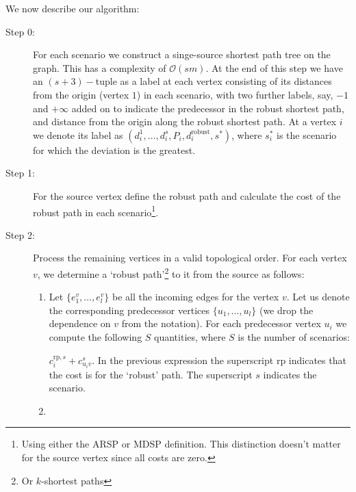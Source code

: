 \documentclass{article}
\begin{document}
We now describe our algorithm:
\begin{description}
\item[Step 0:] For each scenario we construct a singe-source shortest path tree on the graph. This has a complexity of $\mathcal{O}(s m)$. At the end of this step we have an $(s+3)-$tuple as a label at each vertex consisting of its distances from the origin (vertex $1$) in each scenario, with two further labels, say, $-1$ and $+\infty$ added on to indicate the predecessor in the robust shortest path, and distance from the origin along the robust shortest path. At a vertex $i$ we denote its label as $(d_i^1,\dots,d_i^s,P_i,d_i^{\textrm{robust}},s^{*})$, where $s_i^{*}$ is the scenario for which the deviation is the greatest.

\item[Step 1:] For the source vertex define the robust path and calculate the cost of the robust path in each scenario\footnote{Using either the ARSP or MDSP definition. This distinction doesn't matter for the source vertex since all costs are zero.}.

\item[Step 2:] Process the remaining vertices in a valid topological order. For each vertex $v$, we determine a `robust path'\footnote{Or $k$-shortest paths} to it from the source as follows:
\begin{enumerate}
\item Let $\{e^v_1,\dots,e^v_l\}$ be all the incoming edges for the vertex $v$. Let us denote the corresponding predecessor vertices $\{u_1,\dots,u_l\}$ (we drop the dependence on $v$ from the notation). For each predecessor vertex $u_i$ we compute the following $S$ quantities, where $S$ is the number of scenarios: \begin{comment}$c^{\textrm{sp},s}_i + c^s_{u_iv}$ and\end{comment} $c^{\textrm{rp},s}_i + c^s_{u_iv}$. In the previous expression the superscript $\textrm{rp}$ indicates that the cost is for the `robust' path. The superscript $s$ indicates the scenario.
\item 

\end{enumerate}
\end{description}
\end{document}
